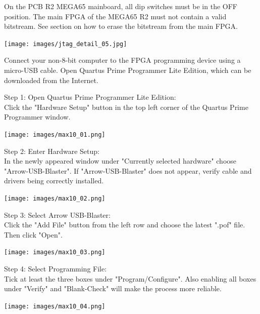 On the PCB R2 MEGA65 mainboard, all dip switches must be in the OFF position. The main FPGA of the MEGA65 R2 must not contain
a valid bitstream. See section  on how to erase the bitstream
from the main FPGA.

\texttt{[image: images/jtag\_detail\_05.jpg]}

Connect your non-8-bit computer to the FPGA programming device using a micro-USB cable.
Open Quartus Prime Programmer Lite Edition, which can be downloaded from the Internet.

\begin{minipage}{\linewidth}
Step 1: Open Quartus Prime Programmer Lite Edition: \\
Click the "Hardware Setup" button in the top left corner of
the Quartus Prime Programmer window.
  \begin{center}
  \texttt{[image: images/max10\_01.png]}
  \end{center}
\end{minipage}

\vspace{5mm}

\begin{minipage}{\linewidth}
Step 2: Enter Hardware Setup: \\
In the newly appeared window under "Currently selected
hardware" choose "Arrow-USB-Blaster".
If "Arrow-USB-Blaster" does not appear, verify cable and
drivers being correctly installed.
  \begin{center}
  \texttt{[image: images/max10\_02.png]}
  \end{center}
\end{minipage}


\begin{minipage}{\linewidth}
Step 3: Select Arrow USB-Blaster: \\
Click the "Add File" button from the left row and choose the
latest ".pof" file. Then click "Open".
  \begin{center}
  \texttt{[image: images/max10\_03.png]}
  \end{center}
\end{minipage}


\begin{minipage}{\linewidth}
Step 4: Select Programming File: \\
Tick at least the three boxes under "Program/Configure".
Also enabling all boxes under "Verify" and "Blank-Check"
will make the process more reliable.
  \begin{center}
  \texttt{[image: images/max10\_04.png]}
  \end{center}
\end{minipage}

